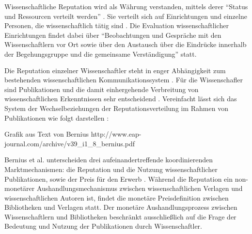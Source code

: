 Wissenschaftliche Reputation wird als Währung verstanden, mittels derer “Status und Ressourcen verteilt werden” \cite{hanekop_2006}. Sie verteilt sich auf Einrichtungen und einzelne Personen, die wissenschaftlich tätig sind \cite{suchen}. Die Evaluation wissenschaftlicher Einrichtungen findet dabei über “Beobachtungen und Gespräche mit den Wissenschaftlern vor Ort sowie über den Austausch über die Eindrücke innerhalb der Begehungsgruppe und die gemeinsame Verständigung”\cite{Barl_sius_2008} statt.

Die Reputation einzelner Wissenschaftler steht in enger Abhängigkeit zum bestehenden wissenschaftlichen Kommunikationssystem \cite{suchen}. Für die Wissenschafler sind Publikationen und die damit einhergehende Verbreitung von wissenschaftlichen Erkenntnissen sehr entscheidend \cite{Hess_2006}. Vereinfacht lässt sich das System der Wechselbeziehungen der Reputationsverteilung im Rahmen von Publikationen wie folgt darstellen \cite{cite:21a}: 

Grafik aus Text von Bernius
http://www.eap-journal.com/archive/v39_i1_8_bernius.pdf

Bernius et al. unterscheiden drei aufeinandertreffende koordinierenden Marktmechanismen: die Reputation und die Nutzung wissenschaftlicher Publikationen, sowie der Preis für den Erwerb \cite{suchen}. Während die Reputation ein non-monetärer Aushandlungsmechanismus zwischen wissenschaftlichen Verlagen und wissenschaftlichen Autoren ist, findet die monetäre Preisdefinition zwischen Bibliotheken und Verlagen statt. Der monetäre Aushandlungsprozess zwischen Wissenschaftlern und Bibliotheken beschränkt ausschließlich auf die Frage der Bedeutung und Nutzung der Publikationen durch Wissenschaftler.\cite{cite:21a}

